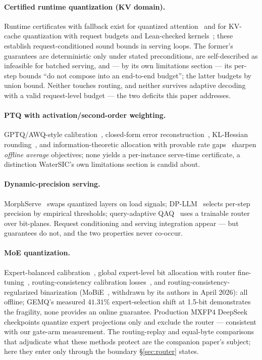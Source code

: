 \documentclass[11pt]{article}
\renewcommand{\_}{\WCorigunderscore\allowbreak}
\begin{document}
\paragraph{Certified runtime quantization (KV domain).} Runtime
certificates with fallback exist for quantized
attention~\cite{calver2026} and for KV-cache quantization with request
budgets and Lean-checked kernels~\cite{witcert2026};
these establish request-conditioned sound bounds in serving loops. The
former's guarantees are deterministic only under stated preconditions,
are self-described as infeasible for batched serving, and --- by its
own limitations section --- its per-step bounds ``do not compose into
an end-to-end budget''; the latter budgets by union bound. Neither
touches routing, and neither survives adaptive decoding with a valid
request-level budget --- the two deficits this paper addresses.
\paragraph{PTQ with activation/second-order weighting.}
GPTQ/AWQ-style calibration~\cite{gptq2023,awq2024}, closed-form error
reconstruction~\cite{qera2025}, KL-Hessian rounding~\cite{yaqa2026}, and
information-theoretic allocation with provable rate
gaps~\cite{watersic2026} sharpen \emph{offline average} objectives; none
yields a per-instance serve-time certificate, a distinction WaterSIC's
own limitations section is candid about.
\paragraph{Dynamic-precision serving.} MorphServe~\cite{morphserve2025}
swaps quantized layers on load signals; DP-LLM~\cite{dpllm2025} selects
per-step precision by empirical thresholds; query-adaptive
QAQ~\cite{qaqqa2025} uses a trainable router over bit-planes. Request conditioning and serving integration appear ---
but guarantees do not, and the two properties never co-occur.
\paragraph{MoE quantization.} Expert-balanced
calibration~\cite{moequant2025}, global expert-level bit allocation with
router fine-tuning~\cite{gemq2026}, routing-consistency calibration
losses~\cite{vsraq2026,eaquant2025,eacmoe2025}, and
routing-consistency-regularized binarization (MoBiE~\cite{mobie2026},
withdrawn by its authors in April 2026): all offline;
GEMQ's measured $41.31\%$ expert-selection shift at 1.5-bit
demonstrates the fragility, none provides an online guarantee.
Production MXFP4 DeepSeek checkpoints quantize expert projections only
and exclude the router --- consistent with our gate-arm measurement.
The routing-replay and equal-byte comparisons that adjudicate what
these methods protect are the companion paper's subject; here they
enter only through the boundary \S\ref{sec:router} states.
\end{document}

